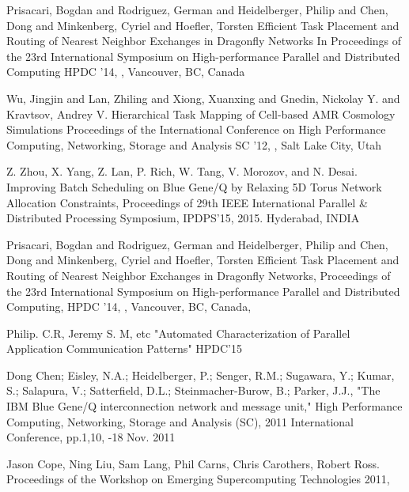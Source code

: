\documentclass[conference]{IEEEtran}
\begin{document}
\begin{thebibliography}{10}
Prisacari, Bogdan and Rodriguez, German and Heidelberger, Philip and Chen, Dong and Minkenberg, Cyriel and Hoefler, Torsten
\newblock Efficient Task Placement and Routing of Nearest Neighbor Exchanges in Dragonfly Networks
\newblock In Proceedings of the 23rd International Symposium on High-performance Parallel and Distributed Computing
\newblock HPDC '14,
,
\newblock Vancouver, BC, Canada

Wu, Jingjin and Lan, Zhiling and Xiong, Xuanxing and Gnedin, Nickolay Y. and Kravtsov, Andrey V.
\newblock Hierarchical Task Mapping of Cell-based AMR Cosmology Simulations
\newblock Proceedings of the International Conference on High Performance Computing, Networking, Storage and Analysis
\newblock SC '12,
,
\newblock Salt Lake City, Utah

Z. Zhou, X. Yang, Z. Lan, P. Rich, W. Tang, V. Morozov, and N. Desai.
\newblock Improving Batch Scheduling on Blue Gene/Q by Relaxing 5D Torus Network Allocation Constraints,
\newblock Proceedings of 29th IEEE International Parallel \& Distributed Processing 
Symposium,
\newblock IPDPS'15, 2015.
\newblock Hyderabad, INDIA

Prisacari, Bogdan and Rodriguez, German and Heidelberger, Philip and Chen, Dong and Minkenberg, Cyriel and Hoefler, Torsten
\newblock Efficient Task Placement and Routing of Nearest Neighbor Exchanges in Dragonfly Networks,
\newblock Proceedings of the 23rd International Symposium on High-performance Parallel and Distributed Computing,
\newblock HPDC '14,
,
\newblock  Vancouver, BC, Canada,


Philip. C.R, Jeremy S. M, etc
\newblock "Automated Characterization of Parallel Application Communication Patterns"
\newblock HPDC'15

Dong Chen; Eisley, N.A.; Heidelberger, P.; Senger, R.M.; Sugawara, Y.; Kumar,
S.; Salapura, V.; Satterfield, D.L.; Steinmacher-Burow, B.; Parker, J.J., 
\newblock "The IBM Blue Gene/Q interconnection network and message unit," 
\newblock High Performance Computing, Networking, Storage and Analysis (SC), 2011 International 
Conference,
\newblock pp.1,10, 
-18 Nov. 2011

Jason Cope, Ning Liu, Sam Lang, Phil Carns, Chris Carothers, Robert Ross.
\newblock Proceedings of the Workshop on Emerging Supercomputing Technologies 2011,



\end{thebibliography}
\end{document}
